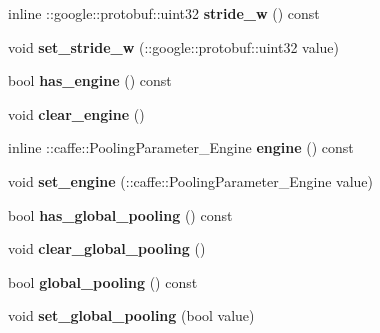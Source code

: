 \begin{DoxyCompactItemize}
inline \+::google\+::protobuf\+::uint32 {\bfseries stride\+\_\+w} () const
\item 
\mbox{\label{classcaffe_1_1_pooling_parameter_aeaca043a476f1fdf2ea231b707a6e665}} 
void {\bfseries set\+\_\+stride\+\_\+w} (\+::google\+::protobuf\+::uint32 value)
\item 
\mbox{\label{classcaffe_1_1_pooling_parameter_a957e65f1558735dba38ba600ffdbb8dd}} 
bool {\bfseries has\+\_\+engine} () const
\item 
\mbox{\label{classcaffe_1_1_pooling_parameter_abddb896edc23e84abaef1697026e5b5a}} 
void {\bfseries clear\+\_\+engine} ()
\item 
\mbox{\label{classcaffe_1_1_pooling_parameter_a034b59e9e2f12b193ae071731078b2b9}} 
inline \+::caffe\+::\+Pooling\+Parameter\+\_\+\+Engine {\bfseries engine} () const
\item 
\mbox{\label{classcaffe_1_1_pooling_parameter_a38322446a8bcb65324d46d47160834dd}} 
void {\bfseries set\+\_\+engine} (\+::caffe\+::\+Pooling\+Parameter\+\_\+\+Engine value)
\item 
\mbox{\label{classcaffe_1_1_pooling_parameter_ad1c3589e2f4da6ecb2456ab66592ec24}} 
bool {\bfseries has\+\_\+global\+\_\+pooling} () const
\item 
\mbox{\label{classcaffe_1_1_pooling_parameter_ae18934533638b102d7b87796f73307a3}} 
void {\bfseries clear\+\_\+global\+\_\+pooling} ()
\item 
\mbox{\label{classcaffe_1_1_pooling_parameter_ac3387e6729a74f75af2c61c7a17bed3d}} 
bool {\bfseries global\+\_\+pooling} () const
\item 
\mbox{\label{classcaffe_1_1_pooling_parameter_acbf8f80344dcb6a7337c9dd9f6c40212}} 
void {\bfseries set\+\_\+global\+\_\+pooling} (bool value)
\item 
\mbox{\label{classcaffe_1_1_pooling_parameter_a9ad9506cbf66e40ed4ba0a64fed7ac89}} 

\end{DoxyCompactItemize}
